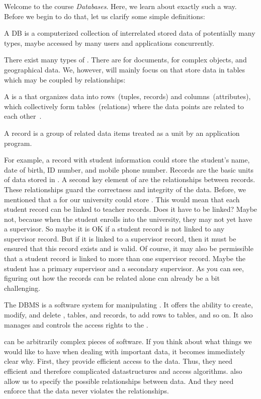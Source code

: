 Welcome to the course \emph{Databases}.
Here, we learn about exactly such a way.
Before we begin to do that, let us clarify some simple definitions:%
%
\begin{definition}[Database]%
A \acrfull{DB} is a computerized collection of interrelated stored data of potentially many types, maybe accessed by many users and applications concurrently.%
\end{definition}%
%
There exist many types of .
There are  for documents,  for complex objects, and  geographical data.
We, however, will mainly focus on  that store data in tables which may be coupled by relationships:%
%
\begin{definition}%
A  is a  that organizes data into rows~(tuples, records) and columns~(attributes), which collectively form tables~(relations) where the data points are related to each other~\cite{I2021WIARDB,C1970ARMODFLSDB,SC1975OTPOARADI,T2018ISARD,H2016RDDAI,HM2024IMARD}.
\end{definition}%
%
\begin{definition}[Record]%
A record is a group of related data items treated as a unit by an application program.%
\end{definition}%
%
For example, a record with student information could store the student's name, date of birth, ID number, and mobile phone number.
Records are the basic units of data stored in .
A second key element of  are the relationships between records.
These relationships guard the correctness and integrity of the data.
Before, we mentioned that a  for our university could store .
This would mean that each student record can be linked to teacher records.
Does it have to be linked?
Maybe not, because when the student enrolls into the university, they may not yet have a supervisor.
So maybe it is OK if a student record is not linked to any supervisor record.
But if it is linked to a supervisor record, then it must be ensured that this record exists and is valid.
Of course, it may also be permissible that a student record is linked to more than one supervisor record.
Maybe the student has a primary supervisor and a secondary supervisor.
As you can see, figuring out how the records can be related alone can already be a bit challenging.%
%
\begin{definition}%
The \acrfull{DBMS} is a software system for manipulating . %
It offers the ability to create, modify, and delete , tables, and records, to add rows to tables, and so on.
It also manages and controls the access rights to the .%
\end{definition}%
%
 can be arbitrarily complex pieces of software.
If you think about what things we would like to have when dealing with important data, it becomes immediately clear why.
First, they provide efficient access to the data.
Thus, they need efficient and therefore complicated datastructures and access algorithms.
 also allow us to specify the possible relationships between data.
And they need enforce that the data never violates the relationships.

